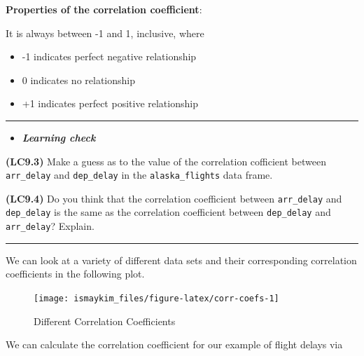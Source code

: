 \documentclass[]{tufte-book}
\newenvironment{Shaded}{\begin{snugshade}}{\end{snugshade}}
\newcommand{\KeywordTok}[1]{\textcolor[rgb]{0.13,0.29,0.53}{\textbf{{#1}}}}
\newcommand{\DataTypeTok}[1]{\textcolor[rgb]{0.13,0.29,0.53}{{#1}}}
\newcommand{\StringTok}[1]{\textcolor[rgb]{0.31,0.60,0.02}{{#1}}}
\newcommand{\NormalTok}[1]{{#1}}
\let\oldrule=\rule
\renewcommand{\rule}[1]{\oldrule{\linewidth}}
\providecommand{\tightlist}{%
  \setlength{\itemsep}{0pt}\setlength{\parskip}{0pt}}
\newenvironment{rmdblock}[1]
  {\begin{shaded*}
  \begin{itemize}
  \renewcommand{\labelitemi}{
    \raisebox{-.7\height}[0pt][0pt]{
    }
  }
  \item
  }
  {
  \end{itemize}
  \end{shaded*}
  }
\newenvironment{learncheck}
  {\begin{rmdblock}{warning}}
  {\end{rmdblock}}
\begin{document}
\textbf{Properties of the correlation coefficient}:

It is always between -1 and 1, inclusive, where

\begin{itemize}
\tightlist
\item
  -1 indicates perfect negative relationship
\item
  0 indicates no relationship
\item
  +1 indicates perfect positive relationship
\end{itemize}

\begin{center}\rule{0.5\linewidth}{\linethickness}\end{center}

\begin{learncheck}
\textbf{\emph{Learning check}}
\end{learncheck}

\textbf{(LC9.3)} Make a guess as to the value of the correlation
cofficient between \texttt{arr\_delay} and \texttt{dep\_delay} in the
\texttt{alaska\_flights} data frame.

\textbf{(LC9.4)} Do you think that the correlation coefficient between
\texttt{arr\_delay} and \texttt{dep\_delay} is the same as the
correlation coefficient between \texttt{dep\_delay} and
\texttt{arr\_delay}? Explain.

\begin{center}\rule{0.5\linewidth}{\linethickness}\end{center}

We can look at a variety of different data sets and their corresponding
correlation coefficients in the following plot.

\begin{figure}

{\centering \texttt{[image: ismaykim\_files/figure-latex/corr-coefs-1]} 

}

\caption[Different Correlation Coefficients]{Different Correlation Coefficients}\label{fig:corr-coefs}
\end{figure}

We can calculate the correlation coefficient for our example of flight
delays via

\begin{Shaded}
\end{Shaded}
\end{document}
